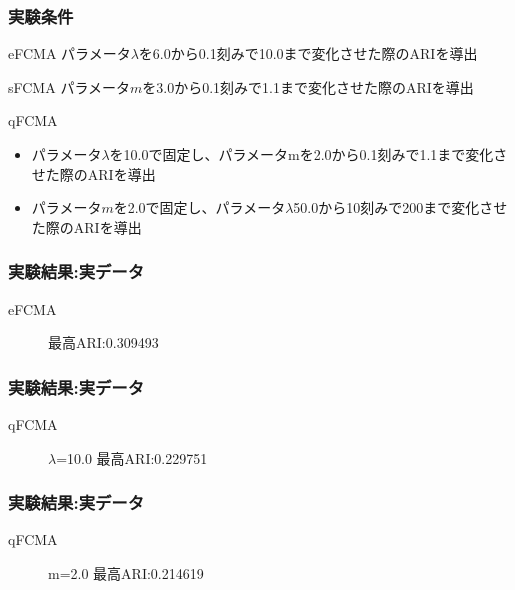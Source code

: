 \documentclass[13pt,dvipdfmx]{beamer}
\begin{document}
\begin{frame}\frametitle{実験条件}
\begin{block}{eFCMA}
  パラメータ$\lambda$を6.0から0.1刻みで10.0まで変化させた際のARIを導出
\end{block}
\begin{block}{sFCMA}
  パラメータ$m$を3.0から0.1刻みで1.1まで変化させた際のARIを導出
\end{block}
\begin{block}{qFCMA}
  \begin{itemize}
  \item パラメータ$\lambda$を10.0で固定し、パラメータmを2.0から0.1刻みで1.1まで変化させた際のARIを導出
  \item パラメータ$m$を2.0で固定し、パラメータ$\lambda$50.0から10刻みで200まで変化させた際のARIを導出
  \end{itemize}
\end{block}
\end{frame}

\begin{frame}\frametitle{実験結果:実データ}
  \begin{block}{eFCMA}
   \begin{figure}[htbp]
    \begin{center}
   \end{center}
   \captionsetup{labelformat=empty,labelsep=none}
   \caption{最高ARI:0.309493}
  \end{figure}
 \end{block}
\end{frame}


\begin{frame}\frametitle{実験結果:実データ}
  \begin{block}{qFCMA}
   \begin{figure}[htbp]
    \begin{center}
   \end{center}
   \captionsetup{labelformat=empty,labelsep=none}
   \caption{$\lambda$=10.0  最高ARI:0.229751}
  \end{figure}
 \end{block}
\end{frame}

\begin{frame}\frametitle{実験結果:実データ}
  \begin{block}{qFCMA}
   \begin{figure}[htbp]
    \begin{center}
   \end{center}
   \captionsetup{labelformat=empty,labelsep=none}
   \caption{m=2.0 最高ARI:0.214619}
  \end{figure}
 \end{block}
\end{frame}
\end{document}
